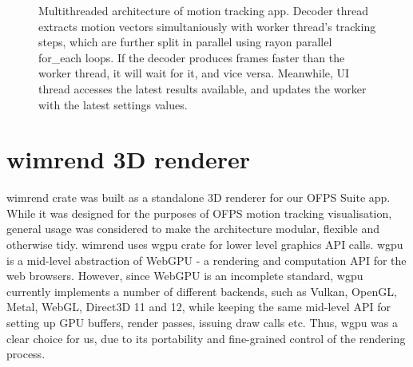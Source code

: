 \documentclass[11pt,english]{report}
\begin{document}
\begin{figure}[!ht]
	\caption{\centering Multithreaded architecture of motion tracking app. Decoder thread extracts motion vectors simultaniously with worker thread's tracking steps, which are further split in parallel using rayon parallel for\_each loops. If the decoder produces frames faster than the worker thread, it will wait for it, and vice versa. Meanwhile, UI thread accesses the latest results available, and updates the worker with the latest settings values. }
\end{figure}

\section{wimrend 3D renderer}

wimrend crate was built as a standalone 3D renderer for our OFPS Suite app. While it was designed for the purposes of OFPS motion tracking visualisation, general usage was considered to make the architecture modular, flexible and otherwise tidy. wimrend uses wgpu crate for lower level graphics API calls. wgpu is a mid-level abstraction of WebGPU - a rendering and computation API for the web browsers\cite{webgpu}. However, since WebGPU is an incomplete standard, wgpu currently implements a number of different backends, such as Vulkan, OpenGL, Metal, WebGL, Direct3D 11 and 12, while keeping the same mid-level API for setting up GPU buffers, render passes, issuing draw calls etc. Thus, wgpu was a clear choice for us, due to its portability and fine-grained control of the rendering process.
\end{document}
